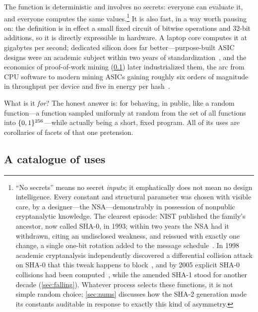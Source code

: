 The function is deterministic and involves no secrets: everyone can evaluate
it, and everyone computes the same values.\footnote{``No secrets'' means
no secret \emph{inputs}; it emphatically does not mean no design
intelligence. Every constant and structural parameter was chosen with
visible care, by a designer---the NSA---demonstrably in possession of
nonpublic cryptanalytic knowledge. The clearest episode: NIST published
the family's ancestor, now called SHA-0, in 1993; within two years the
NSA had it withdrawn, citing an undisclosed weakness, and reissued with
exactly one change, a single one-bit rotation added to the message
schedule~\citep{FIPS180-1}. In 1998 academic cryptanalysis independently
discovered a differential collision attack on SHA-0 that this tweak
happens to block~\citep{ChabaudJoux1998}, and by 2005 explicit SHA-0
collisions had been computed~\citep{BihamChen2005}, while the amended
SHA-1 stood for another decade (\cref{sec:falling}). Whatever process
selects these functions, it is not simple random choice; \cref{sec:nums}
discusses how the SHA-2 generation made its constants auditable in
response to exactly this kind of asymmetry.} It is also fast, in a way
worth pausing on: the definition is in effect a small fixed circuit of
bitwise operations and $32$-bit additions, so it is directly expressible
in hardware. A laptop core computes it at gigabytes per second; dedicated
silicon does far better---purpose-built \SHA{} ASIC designs were an
academic subject within two years of
standardization~\citep{Dadda2004}, and the economics of proof-of-work
mining (\cref{sec:uses}) later industrialized them, the arc from CPU
software to modern mining ASICs gaining roughly six orders of magnitude
in throughput per device and five in energy per hash~\citep{Taylor2017}.

What is it \emph{for}? The honest answer is: for behaving, in public, like
a random function---a function sampled uniformly at random from the set of
all functions into $\{0,1\}^{256}$---while actually being a short,
fixed program. All of its uses are corollaries of facets of that one
pretension.

\subsection{A catalogue of uses}\label{sec:uses}

